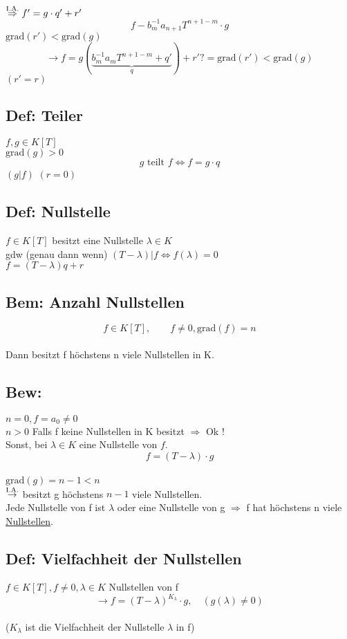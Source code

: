 \documentclass[titlepage,12pt,a4paper,ngerman]{report}
\newcommand{\tx}[1]{\textrm{#1}}
\newcommand{\grad}{\tx{grad}}
\begin{document}
$\buildrel \tx{I.A.}\over \Rightarrow f' = g \cdot  q' + r'$
$$ f - b_{m}^{-1} a_{n+1} T^{n+1-m} \cdot g$$
$\grad(r') < \grad(g)$
$$\rightarrow f = g(\underbrace{b_{m}^{-1} a_{m} T^{n+1-m} + q'}_{q}) + r' ?= \grad(r') < \grad(g)$$
$( r' = r)$

\subsection{Def: Teiler} 
$f,g \in K[T]$\\
$ \grad (g)> 0$
$$g \textrm{ teilt } f \Leftrightarrow f = g\cdot q$$
$(g|f)$ $(r=0)$\\
\subsection{Def: Nullstelle} $f \in K[T]$ besitzt eine Nullstelle $\lambda \in K$\\
gdw (genau dann wenn) $(T-\lambda) | f \Leftrightarrow f(\lambda) = 0$ \\
$f = (T-\lambda) q + r$\\
\subsection{Bem: Anzahl Nullstellen} $$f\in K[T] , \qquad f\neq 0 , \grad(f) = n$$\\
Dann besitzt f höchstens n viele Nullstellen in K.\\
\subsection{Bew:} $n= 0,  f = a_{0} \neq 0$\\
$n> 0 $ Falls f keine Nullstellen in K besitzt $\Rightarrow$ Ok !\\
Sonst, bei $\lambda\in K $ eine Nullstelle von $f$. \\
$$f = (T-\lambda) \cdot g$$\\
$ \grad (g) = n-1< n$\\
$\buildrel \tx{I.A.}\over \rightarrow$ besitzt g höchstens $n-1$ viele Nullstellen.\\
Jede Nullstelle von f ist $\lambda$ oder eine Nullstelle von g $\Rightarrow$ f hat höchstens n viele \underline{Nullstellen}.\\
\subsection{Def: Vielfachheit der Nullstellen} $f\in K[T], f \neq 0 , \lambda \in K$ Nullstellen von f\\
$$\rightarrow f = (T-\lambda)^{K_{\lambda }} \cdot g, \quad (g(\lambda) \neq 0)$$\\
($K_{\lambda}$ ist die Vielfachheit der Nullstelle $\lambda$ in f)\\
\end{document}

